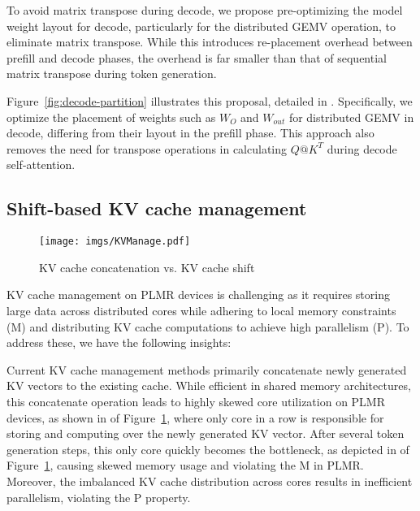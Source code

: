 To avoid matrix transpose during decode, we propose pre-optimizing the model weight layout for decode, particularly for the distributed GEMV operation, to eliminate matrix transpose. While this introduces re-placement overhead between prefill and decode phases, the overhead is far smaller than that of sequential matrix transpose during token generation.

Figure~\ref{fig:decode-partition} illustrates this proposal, detailed in . Specifically, we optimize the placement of weights such as $W_{O}$ and $W_{out}$ for distributed GEMV in decode, differing from their layout in the prefill phase. This approach also removes the need for transpose operations in calculating $Q@K^T$ during decode self-attention.

    \vspace{-3mm}
\subsection{Shift-based KV cache management}\label{sec:parallel:kvcache}
    \vspace{-1mm}
    
\begin{figure}[t!]
    \centering
    \texttt{[image: imgs/KVManage.pdf]}
    \vspace{-9mm}
    \caption{KV cache concatenation vs. KV cache shift}
    \vspace{-5mm}
    \label{fig:kv_cache_update}
\end{figure}

KV cache management on PLMR devices is challenging as it requires storing large data across distributed cores while adhering to local memory constraints (M) and distributing KV cache computations to achieve high parallelism (P). To address these, we have the following insights:

 Current KV cache management methods primarily concatenate newly generated KV vectors to the existing cache. While efficient in shared memory architectures, this concatenate operation leads to highly skewed core utilization on PLMR devices, as shown in  of Figure~\ref{fig:kv_cache_update}, where only core in a row is responsible for storing and computing over the newly generated KV vector. After several token generation steps, this only core quickly becomes the bottleneck, as depicted in  of Figure~\ref{fig:kv_cache_update}, causing skewed memory usage and violating the M in PLMR. Moreover, the imbalanced KV cache distribution across cores results in inefficient parallelism, violating the P property.


